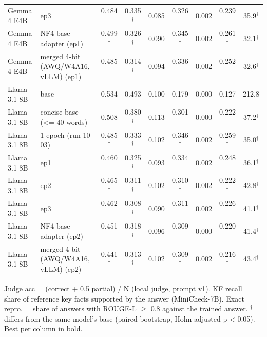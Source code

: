 \begin{table}[t]
{\begin{tabular}{llccccccc}
Gemma 4 E4B & ep3 & 0.484$^\dagger$ & 0.335$^\dagger$ & 0.085 & 0.326$^\dagger$ & 0.002 & 0.239$^\dagger$ & 35.9$^\dagger$ \\
Gemma 4 E4B & NF4 base + adapter (ep1) & 0.499$^\dagger$ & 0.326$^\dagger$ & 0.090 & 0.345$^\dagger$ & 0.002 & 0.261$^\dagger$ & 32.1$^\dagger$ \\
Gemma 4 E4B & merged 4-bit (AWQ/W4A16, vLLM) (ep1) & 0.485$^\dagger$ & 0.314$^\dagger$ & 0.094 & 0.336$^\dagger$ & 0.002 & 0.252$^\dagger$ & 32.6$^\dagger$ \\
Llama 3.1 8B & base & 0.534 & 0.493 & 0.100 & 0.179 & 0.000 & 0.127 & 212.8 \\
Llama 3.1 8B & concise base (<= 40 words) & 0.508 & 0.380$^\dagger$ & 0.113 & 0.301$^\dagger$ & 0.000 & 0.222$^\dagger$ & 37.2$^\dagger$ \\
Llama 3.1 8B & 1-epoch (run 10-03) & 0.485$^\dagger$ & 0.333$^\dagger$ & 0.102 & 0.346$^\dagger$ & 0.002 & 0.259$^\dagger$ & 35.0$^\dagger$ \\
Llama 3.1 8B & ep1 & 0.460$^\dagger$ & 0.325$^\dagger$ & 0.093 & 0.334$^\dagger$ & 0.002 & 0.248$^\dagger$ & 36.1$^\dagger$ \\
Llama 3.1 8B & ep2 & 0.465$^\dagger$ & 0.311$^\dagger$ & 0.102 & 0.310$^\dagger$ & 0.002 & 0.222$^\dagger$ & 42.8$^\dagger$ \\
Llama 3.1 8B & ep3 & 0.462$^\dagger$ & 0.308$^\dagger$ & 0.090 & 0.311$^\dagger$ & 0.002 & 0.226$^\dagger$ & 41.1$^\dagger$ \\
Llama 3.1 8B & NF4 base + adapter (ep2) & 0.451$^\dagger$ & 0.318$^\dagger$ & 0.096 & 0.309$^\dagger$ & 0.000 & 0.220$^\dagger$ & 41.4$^\dagger$ \\
Llama 3.1 8B & merged 4-bit (AWQ/W4A16, vLLM) (ep2) & 0.441$^\dagger$ & 0.313$^\dagger$ & 0.102 & 0.309$^\dagger$ & 0.002 & 0.216$^\dagger$ & 43.4$^\dagger$ \\
\bottomrule
\end{tabular}}
\par\smallskip\footnotesize Judge acc = (correct + 0.5 partial) / N (local judge, prompt v1). KF recall = share of reference key facts supported by the answer (MiniCheck-7B). Exact repro. = share of answers with ROUGE-L $\geq$ 0.8 against the trained answer. $^\dagger$ = differs from the same model's base (paired bootstrap, Holm-adjusted p < 0.05). Best per column in bold.
\end{table}
